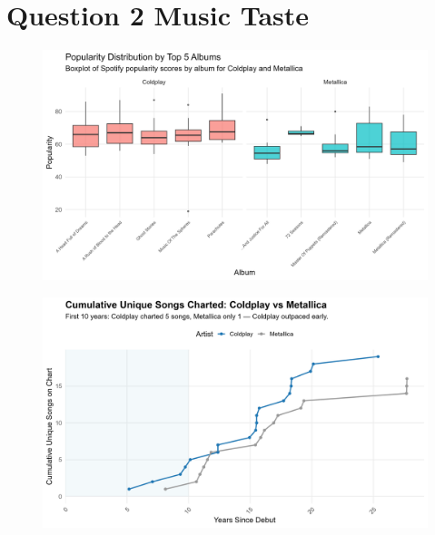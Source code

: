 \documentclass[
  man,floatsintext]{apa6}
\begin{document}
\section{Question 2 Music Taste}\label{question-2-music-taste}

\begin{figure}

{\centering \includegraphics[width=0.9\linewidth]{../Question2/Results/popalbums} 

}

\caption{ }\label{fig:include-image-1}
\end{figure}
\begin{figure}

{\centering \includegraphics[width=0.9\linewidth]{../Question2/Results/uniquesongs} 

}

\caption{ }\label{fig:include-image-2}
\end{figure}
\end{document}
